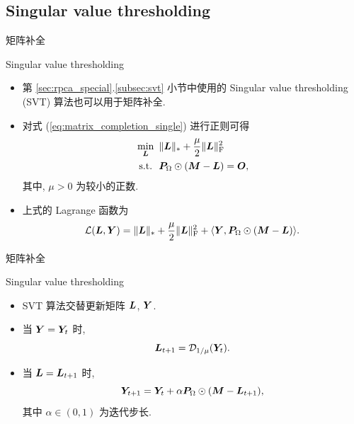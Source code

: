 \documentclass{beamer}
\begin{document}
\subsection{Singular value thresholding}

\begin{frame}{矩阵补全}
  \begin{block}{Singular value thresholding}
    \begin{itemize}
      \item 第 \ref{sec:rpca_special}.\ref{subsec:svt} 小节中使用的 Singular value thresholding (SVT) \cite{cai2010singular} 算法也可以用于矩阵补全.
      \item 对式 (\ref{eq:matrix_completion_single}) 进行正则可得
      \begin{equation}
        \begin{aligned}
          &\min_{\bm{L}}~\|\bm{L}\|_{*}+\frac{\mu}{2}\|\bm{L}\|_{\text{F}}^2 \\
          &~\text{s.t.}~~\bm{P}_\Omega\odot(\bm{M}-\bm{L})=\bm{O},
        \end{aligned}
      \end{equation}
      其中, $\mu>0$ 为较小的正数.
      \item 上式的 Lagrange 函数为
      \begin{equation}
        \mathcal{L}(\bm{L},\bm{Y})=\|\bm{L}\|_{*}+\frac{\mu}{2}\|\bm{L}\|_{\text{F}}^2+\langle\bm{Y},\bm{P}_\Omega\odot(\bm{M}-\bm{L})\rangle.
      \end{equation}
    \end{itemize}
  \end{block}
\end{frame}

\begin{frame}{矩阵补全}
  \begin{block}{Singular value thresholding}
    \begin{itemize}
      \item SVT 算法交替更新矩阵 $\bm{L}$, $\bm{Y}$.
      \item 当 $\bm{Y}=\bm{Y}_t$ 时,
      \begin{equation}
        \bm{L}_{t+1}
        =\mathcal{D}_{1/\mu}(\bm{Y}_t).
      \end{equation}
      \item 当 $\bm{L}=\bm{L}_{t+1}$ 时,
      \begin{equation}
        \bm{Y}_{t+1}
        =\bm{Y}_t+\alpha\bm{P}_\Omega\odot(\bm{M}-\bm{L}_{t+1}),
      \end{equation}
      其中 $\alpha\in(0,1)$ 为迭代步长.
    \end{itemize}
  \end{block}
\end{frame}
\end{document}
